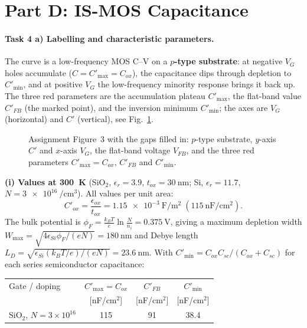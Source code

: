 \section*{Part D: IS-MOS Capacitance}

\paragraph{Task 4 a) Labelling and characteristic parameters.}
The curve is a low-frequency MOS C--V on a \textbf{$p$-type substrate}: at negative $V_G$ holes
accumulate ($C=C'_{\max}=C_{ox}$), the capacitance dips through depletion to $C'_{\min}$, and at
positive $V_G$ the low-frequency minority response brings it back up. The three red parameters are
the accumulation plateau $C'_{\max}$, the flat-band value $C'_{FB}$ (the marked point), and the
inversion minimum $C'_{\min}$; the axes are $V_G$ (horizontal) and $C'$ (vertical), see
Fig.~\ref{fig:cv-annot}.

\begin{figure}[H]
\centering

\caption{Assignment Figure~3 with the gaps filled in: $p$-type substrate, $y$-axis $C'$ and $x$-axis
$V_G$, the flat-band voltage $V_{FB}$, and the three red parameters $C'_{\max}=C_{ox}$, $C'_{FB}$ and
$C'_{\min}$.}
\label{fig:cv-annot}
\end{figure}

\textbf{(i) Values at \SI{300}{\kelvin}} (SiO$_2$, $\epsilon_r=3.9$, $t_{ox}=\SI{30}{\nm}$;
Si, $\epsilon_r=11.7$, $N=\SI{3e16}{\per\cubic\cm}$). All values per unit area:
\[
C'_{ox}=\frac{\epsilon_{ox}}{t_{ox}}=\SI{1.15e-3}{\farad\per\square\meter}\;(\SI{115}{\nano\farad\per\square\cm}).
\]
The bulk potential is $\phi_F=\tfrac{k_BT}{e}\ln\!\tfrac{N}{n_i}=\SI{0.375}{\volt}$, giving a maximum
depletion width
$W_{\max}=\sqrt{4\epsilon_{Si}\phi_F/(eN)}=\SI{180}{\nm}$ and Debye length
$L_D=\sqrt{\epsilon_{Si}(k_BT/e)/(eN)}=\SI{23.6}{\nm}$. With
$C'_{\min}=C_{ox}C_{sc}/(C_{ox}+C_{sc})$ for each series semiconductor capacitance:
\begin{center}\small
\begin{tabular}{lccc}
\toprule
Gate / doping & $C'_{\max}=C_{ox}$ & $C'_{FB}$ & $C'_{\min}$ \\
 & [nF/cm$^2$] & [nF/cm$^2$] & [nF/cm$^2$] \\
\midrule
SiO$_2$, $N=3{\times}10^{16}$ & 115 & 91 & 38.4 \\
\bottomrule
\end{tabular}
\end{center}

